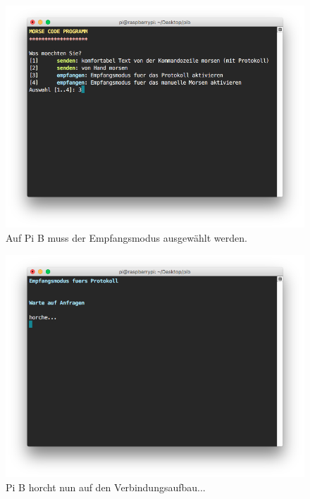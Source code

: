 \documentclass[12pt, a4paper]{article}
\begin{document}
\newpage
\begin{figure}[H]
	\centering
	\includegraphics[width=1.0\textwidth]{sshot_7.png}
	\caption{Auf Pi B muss der Empfangsmodus ausgewählt werden.}
\end{figure}

\newpage
\begin{figure}[H]
	\centering
	\includegraphics[width=1.0\textwidth]{sshot_9.png}
	\caption{Pi B horcht nun auf den Verbindungsaufbau...}
\end{figure}
\end{document}
